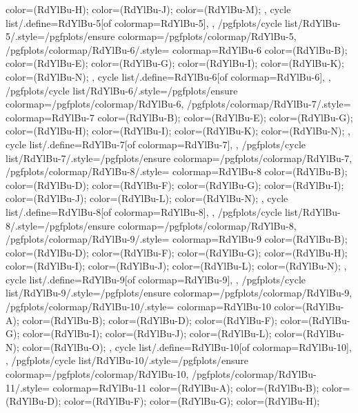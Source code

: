 {{{      color=(RdYlBu-H);
      color=(RdYlBu-J);
      color=(RdYlBu-M);
    },
    cycle list/.define={RdYlBu-5}{[of colormap=RdYlBu-5]},
  },
  /pgfplots/cycle list/RdYlBu-5/.style={/pgfplots/ensure colormap={/pgfplots/colormap/RdYlBu-5}},
  /pgfplots/colormap/RdYlBu-6/.style={
    colormap={RdYlBu-6}{
      color=(RdYlBu-B);
      color=(RdYlBu-E);
      color=(RdYlBu-G);
      color=(RdYlBu-I);
      color=(RdYlBu-K);
      color=(RdYlBu-N);
    },
    cycle list/.define={RdYlBu-6}{[of colormap=RdYlBu-6]},
  },
  /pgfplots/cycle list/RdYlBu-6/.style={/pgfplots/ensure colormap={/pgfplots/colormap/RdYlBu-6}},
  /pgfplots/colormap/RdYlBu-7/.style={
    colormap={RdYlBu-7}{
      color=(RdYlBu-B);
      color=(RdYlBu-E);
      color=(RdYlBu-G);
      color=(RdYlBu-H);
      color=(RdYlBu-I);
      color=(RdYlBu-K);
      color=(RdYlBu-N);
    },
    cycle list/.define={RdYlBu-7}{[of colormap=RdYlBu-7]},
  },
  /pgfplots/cycle list/RdYlBu-7/.style={/pgfplots/ensure colormap={/pgfplots/colormap/RdYlBu-7}},
  /pgfplots/colormap/RdYlBu-8/.style={
    colormap={RdYlBu-8}{
      color=(RdYlBu-B);
      color=(RdYlBu-D);
      color=(RdYlBu-F);
      color=(RdYlBu-G);
      color=(RdYlBu-I);
      color=(RdYlBu-J);
      color=(RdYlBu-L);
      color=(RdYlBu-N);
    },
    cycle list/.define={RdYlBu-8}{[of colormap=RdYlBu-8]},
  },
  /pgfplots/cycle list/RdYlBu-8/.style={/pgfplots/ensure colormap={/pgfplots/colormap/RdYlBu-8}},
  /pgfplots/colormap/RdYlBu-9/.style={
    colormap={RdYlBu-9}{
      color=(RdYlBu-B);
      color=(RdYlBu-D);
      color=(RdYlBu-F);
      color=(RdYlBu-G);
      color=(RdYlBu-H);
      color=(RdYlBu-I);
      color=(RdYlBu-J);
      color=(RdYlBu-L);
      color=(RdYlBu-N);
    },
    cycle list/.define={RdYlBu-9}{[of colormap=RdYlBu-9]},
  },
  /pgfplots/cycle list/RdYlBu-9/.style={/pgfplots/ensure colormap={/pgfplots/colormap/RdYlBu-9}},
  /pgfplots/colormap/RdYlBu-10/.style={
    colormap={RdYlBu-10}{
      color=(RdYlBu-A);
      color=(RdYlBu-B);
      color=(RdYlBu-D);
      color=(RdYlBu-F);
      color=(RdYlBu-G);
      color=(RdYlBu-I);
      color=(RdYlBu-J);
      color=(RdYlBu-L);
      color=(RdYlBu-N);
      color=(RdYlBu-O);
    },
    cycle list/.define={RdYlBu-10}{[of colormap=RdYlBu-10]},
  },
  /pgfplots/cycle list/RdYlBu-10/.style={/pgfplots/ensure colormap={/pgfplots/colormap/RdYlBu-10}},
  /pgfplots/colormap/RdYlBu-11/.style={
    colormap={RdYlBu-11}{
      color=(RdYlBu-A);
      color=(RdYlBu-B);
      color=(RdYlBu-D);
      color=(RdYlBu-F);
      color=(RdYlBu-G);
      color=(RdYlBu-H);
}}}
